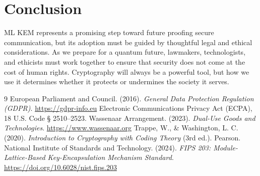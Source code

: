 \documentclass[12pt]{article}
\begin{document}
\section*{Conclusion}
ML KEM represents a promising step toward future proofing secure communication, but its adoption must be guided by thoughtful legal and ethical considerations. As we prepare for a quantum future, lawmakers, technologists, and ethicists must work together to ensure that security does not come at the cost of human rights. Cryptography will always be a powerful tool, but how we use it determines whether it protects or undermines the society it serves.

\begin{thebibliography}{9}
European Parliament and Council. (2016). \textit{General Data Protection Regulation (GDPR)}. \url{https://gdpr-info.eu}
Electronic Communications Privacy Act (ECPA), 18 U.S. Code § 2510–2523.
Wassenaar Arrangement. (2023). \textit{Dual-Use Goods and Technologies}. \url{https://www.wassenaar.org}
Trappe, W., \& Washington, L. C. (2020). \textit{Introduction to Cryptography with Coding Theory} (3rd ed.). Pearson.
National Institute of Standards and Technology. (2024). \textit{FIPS 203: Module-Lattice-Based Key-Encapsulation Mechanism Standard}. \url{https://doi.org/10.6028/nist.fips.203}
\end{thebibliography}
\end{document}
